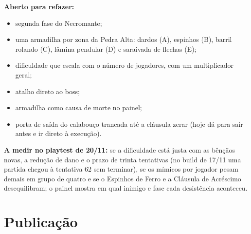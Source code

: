 \documentclass[11pt,a4paper]{article}
\begin{document}
\textbf{Aberto para refazer:}
\begin{itemize}
    \item segunda fase do Necromante;
    \item uma armadilha por zona da Pedra Alta: dardos (A), espinhos (B), barril rolando (C), lâmina pendular (D) e saraivada de flechas (E);
    \item dificuldade que escala com o número de jogadores, com um multiplicador geral;
    \item atalho direto ao boss;
    \item armadilha como causa de morte no painel;
    \item porta de saída do calabouço trancada até a cláusula zerar (hoje dá para sair antes e ir direto à execução).
\end{itemize}

\textbf{A medir no playtest de 20/11:} se a dificuldade está justa com as bênçãos novas, a redução de dano e o prazo de trinta tentativas (no build de 17/11 uma partida chegou à tentativa 62 sem terminar), se os mímicos por jogador pesam demais em grupo de quatro e se o Espinhos de Ferro e a Cláusula de Acréscimo desequilibram; o painel mostra em qual inimigo e fase cada desistência aconteceu.

\section{Publicação}
\end{document}
